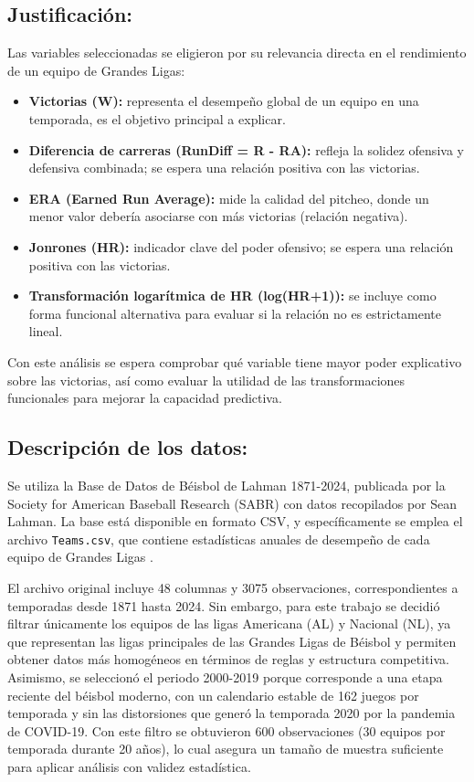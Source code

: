 \documentclass[10pt]{article}
\begin{document}
\subsection{Justificación:}
Las variables seleccionadas se eligieron por su relevancia directa en el rendimiento de un equipo de Grandes Ligas:
\begin{itemize}
    \item \textbf{Victorias (W):} representa el desempeño global de un equipo en una temporada, es el objetivo principal a explicar.
    \item \textbf{Diferencia de carreras (RunDiff = R - RA):} refleja la solidez ofensiva y defensiva combinada; se espera una relación positiva con las victorias.
    \item \textbf{ERA (Earned Run Average):} mide la calidad del pitcheo, donde un menor valor debería asociarse con más victorias (relación negativa).
    \item \textbf{Jonrones (HR):} indicador clave del poder ofensivo; se espera una relación positiva con las victorias.
    \item \textbf{Transformación logarítmica de HR (log(HR+1)):} se incluye como forma funcional alternativa para evaluar si la relación no es estrictamente lineal.
\end{itemize}
Con este análisis se espera comprobar qué variable tiene mayor poder explicativo sobre las victorias, así como evaluar la utilidad de las transformaciones funcionales para mejorar la capacidad predictiva.
\subsection{Descripción de los datos:}
Se utiliza la Base de Datos de Béisbol de Lahman 1871-2024, publicada por la Society for American Baseball Research (SABR) con datos recopilados por Sean Lahman. La base está disponible en formato CSV, y específicamente se emplea el archivo \texttt{Teams.csv}, que contiene estadísticas anuales de desempeño de cada equipo de Grandes Ligas . 

El archivo original incluye 48 columnas y 3075 observaciones, correspondientes a temporadas desde 1871 hasta 2024. Sin embargo, para este trabajo se decidió filtrar únicamente los equipos de las ligas Americana (AL) y Nacional (NL), ya que representan las ligas principales de las Grandes Ligas de Béisbol y permiten obtener datos más homogéneos en términos de reglas y estructura competitiva. Asimismo, se seleccionó el periodo 2000-2019 porque corresponde a una etapa reciente del béisbol moderno, con un calendario estable de 162 juegos por temporada y sin las distorsiones que generó la temporada 2020 por la pandemia de COVID-19. Con este filtro se obtuvieron 600 observaciones (30 equipos por temporada durante 20 años), lo cual asegura un tamaño de muestra suficiente para aplicar análisis con validez estadística.
\end{document}
